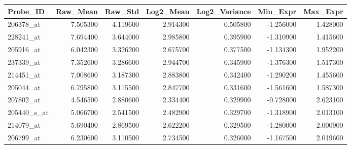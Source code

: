 \begin{tabular}{lrrrrrr}
\toprule
Probe_ID & Raw_Mean & Raw_Std & Log2_Mean & Log2_Variance & Min_Expr & Max_Expr \\
\midrule
206378_at & 7.505300 & 4.119600 & 2.914300 & 0.505800 & -1.256000 & 1.428000 \\
228241_at & 7.694400 & 3.644000 & 2.985800 & 0.395900 & -1.310900 & 1.415600 \\
205916_at & 6.042300 & 3.326200 & 2.675700 & 0.377500 & -1.134300 & 1.952200 \\
237339_at & 7.352600 & 3.286600 & 2.944700 & 0.345900 & -1.376300 & 1.517300 \\
214451_at & 7.008600 & 3.187300 & 2.883800 & 0.342400 & -1.290200 & 1.455600 \\
205044_at & 6.795800 & 3.115500 & 2.847700 & 0.331600 & -1.561600 & 1.587300 \\
207802_at & 4.546500 & 2.880600 & 2.334400 & 0.329900 & -0.728000 & 2.623100 \\
205440_s_at & 5.066700 & 2.541500 & 2.482900 & 0.329700 & -1.318900 & 2.013100 \\
214079_at & 5.690400 & 2.869500 & 2.622200 & 0.329500 & -1.280000 & 2.000900 \\
206799_at & 6.230600 & 3.110500 & 2.734500 & 0.326000 & -1.167500 & 2.019600 \\
\bottomrule
\end{tabular}
